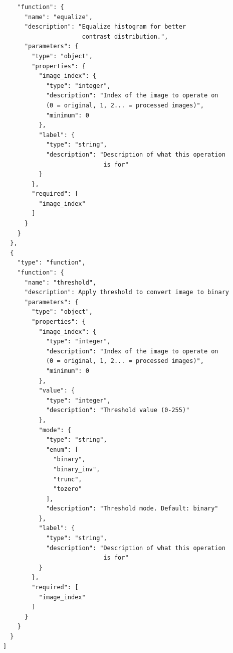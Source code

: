 \documentclass[runningheads]{llncs}
\theoremstyle{plain}
\theoremstyle{definition}
\theoremstyle{remark}
\begin{document}
\begin{tcolorbox}
\begin{verbatim}
    "function": {
      "name": "equalize",
      "description": "Equalize histogram for better
                      contrast distribution.",
      "parameters": {
        "type": "object",
        "properties": {
          "image_index": {
            "type": "integer",
            "description": "Index of the image to operate on
            (0 = original, 1, 2... = processed images)",
            "minimum": 0
          },
          "label": {
            "type": "string",
            "description": "Description of what this operation
                            is for"
          }
        },
        "required": [
          "image_index"
        ]
      }
    }
  },
  {
    "type": "function",
    "function": {
      "name": "threshold",
      "description": Apply threshold to convert image to binary
      "parameters": {
        "type": "object",
        "properties": {
          "image_index": {
            "type": "integer",
            "description": "Index of the image to operate on
            (0 = original, 1, 2... = processed images)",
            "minimum": 0
          },
          "value": {
            "type": "integer",
            "description": "Threshold value (0-255)"
          },
          "mode": {
            "type": "string",
            "enum": [
              "binary",
              "binary_inv",
              "trunc",
              "tozero"
            ],
            "description": "Threshold mode. Default: binary"
          },
          "label": {
            "type": "string",
            "description": "Description of what this operation
                            is for"
          }
        },
        "required": [
          "image_index"
        ]
      }
    }
  }
]
\end{verbatim}
\end{tcolorbox}
\end{document}
